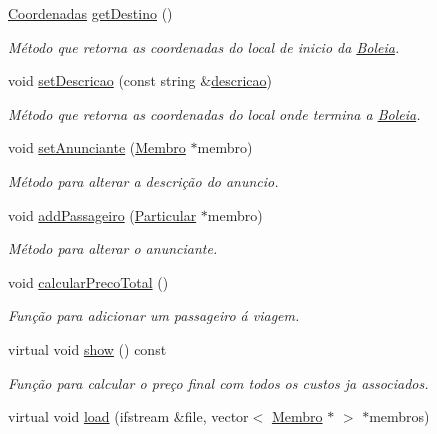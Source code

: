 \begin{DoxyCompactItemize}
\hyperlink{class_coordenadas}{Coordenadas} \hyperlink{class_anuncio_a12f2d6fa24c7255bb608e4c653740bb8}{get\+Destino} ()
\begin{DoxyCompactList}\small\item\em Método que retorna as coordenadas do local de inicio da \hyperlink{class_boleia}{Boleia}. \end{DoxyCompactList}\item 
void \hyperlink{class_anuncio_a8746d4708c5622947b17385414320e88}{set\+Descricao} (const string \&\hyperlink{class_anuncio_aa6a9eb8d08cb06d16061b006eb2c8b97}{descricao})
\begin{DoxyCompactList}\small\item\em Método que retorna as coordenadas do local onde termina a \hyperlink{class_boleia}{Boleia}. \end{DoxyCompactList}\item 
void \hyperlink{class_anuncio_ae0b9bb731a6bf78af45ac2e77ad9e69b}{set\+Anunciante} (\hyperlink{class_membro}{Membro} $\ast$membro)
\begin{DoxyCompactList}\small\item\em Método para alterar a descrição do anuncio. \end{DoxyCompactList}\item 
void \hyperlink{class_anuncio_ae923c9a29c91a103aecd705824f198aa}{add\+Passageiro} (\hyperlink{class_particular}{Particular} $\ast$membro)
\begin{DoxyCompactList}\small\item\em Método para alterar o anunciante. \end{DoxyCompactList}\item 
void \hyperlink{class_anuncio_ac49d84d1a011803f9676f1e47c252125}{calcular\+Preco\+Total} ()
\begin{DoxyCompactList}\small\item\em Função para adicionar um passageiro á viagem. \end{DoxyCompactList}\item 
virtual void \hyperlink{class_anuncio_a71729dba796d57356afe20eff021c2d5}{show} () const 
\begin{DoxyCompactList}\small\item\em Função para calcular o preço final com todos os custos ja associados. \end{DoxyCompactList}\item 
virtual void \hyperlink{class_anuncio_a58f1190bb4a2f1743ee76109be853e31}{load} (ifstream \&file, vector$<$ \hyperlink{class_membro}{Membro} $\ast$ $>$ $\ast$membros)

\end{DoxyCompactItemize}
